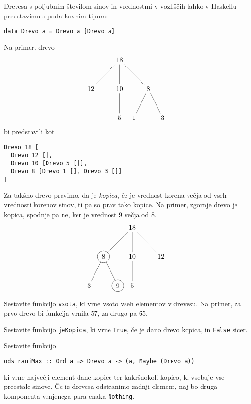 \documentclass[arhiv]{../izpit}
\begin{document}


Drevesa s poljubnim številom sinov in vrednostmi v vozliščih lahko v Haskellu predstavimo
s podatkovnim tipom:
\begin{verbatim}
data Drevo a = Drevo a [Drevo a]
\end{verbatim}
Na primer, drevo
\[
  \begin{tikzpicture}
    \node (d) {18}
      child {node {12}}
      child {node {10}
        child {node {5}}
      }
      child {node {8}
        child {node {1}}
        child {node {3}}
      }
    ;
  \end{tikzpicture}
\]
bi predstavili kot
\begin{verbatim}
Drevo 18 [
  Drevo 12 [],
  Drevo 10 [Drevo 5 []],
  Drevo 8 [Drevo 1 [], Drevo 3 []]
]
\end{verbatim}

\noindent
Za takšno drevo pravimo, da je \emph{kopica}, če je vrednost korena večja od vseh
vrednosti korenov sinov, ti pa so prav tako kopice. Na primer, zgornje
drevo je kopica, spodnje pa ne, ker je vrednost 9 večja od 8.
  \[
    \begin{tikzpicture}
      \node (e) {18}
        child {node[draw, circle] {8}
          child {node {3}}
          child {node[draw, circle] {9}}
        }
        child {node {10}
          child {node {5}}
        }
        child {node {12}}
      ;
    \end{tikzpicture}  
  \]

\podnaloga[10 točk]
  Sestavite funkcijo \verb|vsota|, ki vrne vsoto vseh elementov v drevesu.
  Na primer, za prvo drevo bi funkcija vrnila $57$, za drugo pa $65$.

\podnaloga[10 točk]
  Sestavite funkcijo \verb|jeKopica|, ki vrne \verb|True|, če je dano drevo
  kopica, in \verb|False| sicer.

\podnaloga[10 točk]
  Sestavite funkcijo
\begin{verbatim}odstraniMax :: Ord a => Drevo a -> (a, Maybe (Drevo a))
\end{verbatim}
 ki vrne največji element dane kopice ter kakršnokoli
  kopico, ki vsebuje vse preostale sinove. Če iz drevesa odstranimo
  zadnji element, naj bo druga komponenta vrnjenega para enaka \verb|Nothing|.
\end{document}
